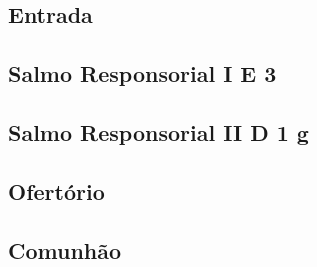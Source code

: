 
\subsection{Entrada}\label{subsection:hebdomada-sancta/missa-chrismatis/psalmi-ad-introitum}

\AllowPageFlush

\subsection[Salmo Responsorial I]{Salmo Responsorial I \textmd{E 3}}\label{subsection:hebdomada-sancta/missa-chrismatis/psalmus-responsorius-1}

\AllowPageFlush

\subsection[Salmo Responsorial II]{Salmo Responsorial II \textmd{D 1 g}}\label{subsection:hebdomada-sancta/missa-chrismatis/psalmus-responsorius-2}

\AllowPageBreak

\subsection{Ofertório}\label{subsection:hebdomada-sancta/missa-chrismatis/psalmi-ad-offertorium}

\AllowPageFlush

\subsection{Comunhão}\label{subsection:hebdomada-sancta/missa-chrismatis/psalmi-ad-communionem}

